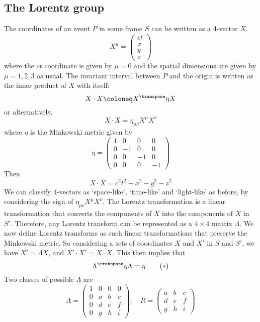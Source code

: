 \subsection{The Lorentz group}
The coordinates of an event \(P\) in some frame \(S\) can be written as a 4-vector \(X\).
\[
	X^\mu = \begin{pmatrix}
		ct \\ x \\ y \\ z
	\end{pmatrix}
\]
where the \(ct\) coordinate is given by \(\mu = 0\) and the spatial dimensions are given by \(\mu = 1, 2, 3\) as usual.
The invariant interval between \(P\) and the origin is written as the inner product of \(X\) with itself:
\[
	X \cdot X \coloneq X^\transpose \eta X
\]
or alternatively,
\[
	X \cdot X = \eta_{\mu\nu} X^\mu X^\nu
\]
where \(\eta\) is the Minkowski metric given by
\[
	\eta = \begin{pmatrix}
		1 & 0  & 0  & 0  \\
		0 & -1 & 0  & 0  \\
		0 & 0  & -1 & 0  \\
		0 & 0  & 0  & -1
	\end{pmatrix}
\]
Then
\[
	X \cdot X = c^2t^2 - x^2 - y^2 - z^2
\]
We can classify 4-vectors as `space-like', `time-like' and `light-like' as before, by considering the sign of \(\eta_{\mu\nu}X^\mu X^\nu\).
The Lorentz transformation is a linear transformation that converts the components of \(X\) into the components of \(X\) in \(S'\).
Therefore, any Lorentz transform can be represented as a \(4\times 4\) matrix \(\Lambda\).
We now define Lorentz transforms as such linear transformations that preserve the Minkowski metric.
So considering a sets of coordinates \(X\) and \(X'\) in \(S\) and \(S'\), we have \(X' = \Lambda X\), and \(X' \cdot X' = X \cdot X\).
This then implies that
\begin{equation}
	\Lambda^\transpose \eta \Lambda = \eta \tag{\(\ast\)}
\end{equation}
Two classes of possible \(\Lambda\) are
\[
	\Lambda = \begin{pmatrix}
		1 & 0 & 0 & 0 \\
		0 & a & b & c \\
		0 & d & e & f \\
		0 & g & h & i
	\end{pmatrix};\quad R = \begin{pmatrix}
		a & b & c \\
		d & e & f \\
		g & h & i
	\end{pmatrix}
\]
